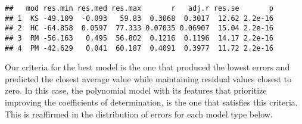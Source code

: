 \documentclass[
]{article}
\begin{document}
\begin{verbatim}
##   mod res.min res.med res.max       r   adj.r res.se       p
## 1  KS -49.109  -0.093   59.83  0.3068  0.3017  12.62 2.2e-16
## 2  HC -64.858  0.0597  77.333 0.07035 0.06907  15.04 2.2e-16
## 3  RM -56.163   0.495  56.802  0.1216  0.1196  14.17 2.2e-16
## 4  PM -42.629   0.041  60.187  0.4091  0.3977  11.72 2.2e-16
\end{verbatim}

Our criteria for the best model is the one that produced the lowest
errors and predicted the closest average value while maintaining
residual values closest to zero. In this case, the polynomial model with
its features that prioritize improving the coefficients of
determination, is the one that satisfies this criteria. This is
reaffirmed in the distribution of errors for each model type below.
\end{document}
